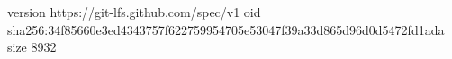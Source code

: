 version https://git-lfs.github.com/spec/v1
oid sha256:34f85660e3ed4343757f622759954705e53047f39a33d865d96d0d5472fd1ada
size 8932
